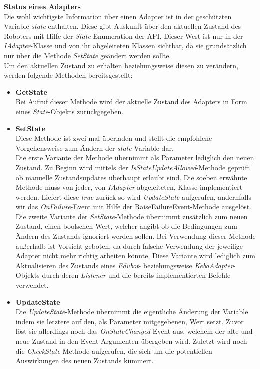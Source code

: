 \textbf{Status eines Adapters}\\
Die wohl wichtigste Information über einen Adapter ist in der geschützten Variable \textit{state} enthalten. Diese gibt Auskunft über den aktuellen Zustand des Roboters mit Hilfe der \textit{State}-Enumeration der API. Dieser Wert ist nur in der \textit{IAdapter}-Klasse und von ihr abgeleiteten Klassen sichtbar, da sie grundsätzlich nur über die Methode \textit{SetState} geändert werden sollte.\\
Um den aktuellen Zustand zu erhalten beziehungsweise diesen zu verändern, werden folgende Methoden bereitsgestellt:
\begin{itemize}
\item \textbf{GetState}\\
Bei Aufruf dieser Methode wird der aktuelle Zustand des Adapters in Form eines \textit{State}-Objekts zurückgegeben.
\item \textbf{SetState}\\
Diese Methode ist zwei mal überladen und stellt die empfohlene Vorgehensweise zum Ändern der \textit{state}-Variable dar.\\
Die erste Variante der Methode übernimmt als Parameter lediglich den neuen Zustand. Zu Beginn wird mittels der \textit{IsStateUpdateAllowed}-Methode geprüft ob manuelle Zustandsupdates überhaupt erlaubt sind. Die soeben erwähnte Methode muss von jeder, von \textit{IAdapter} abgeleiteten, Klasse implementiert werden. Liefert diese \textit{true} zurück so wird \textit{UpdateState} aufgerufen, andernfalls wir das \textit{OnFailure}-Event mit Hilfe der RaiseFailureEvent-Methode ausgelöst.\\
Die zweite Variante der \textit{SetState}-Methode übernimmt zusätzlich zum neuen Zustand, einen boolschen Wert, welcher angibt ob die Bedingungen zum Ändern des Zustands ignoriert werden sollen. Bei Verwendung dieser Methode außerhalb ist Vorsicht geboten, da durch falsche Verwendung der jeweilige Adapter nicht mehr richtig arbeiten könnte. Diese Variante wird lediglich zum Aktualisieren des Zustands eines \textit{Edubot}- beziehungsweise \textit{KebaAdapter}-Objekts durch deren \textit{Listener} und die bereits implementierten Befehle verwendet.
\item \textbf{UpdateState}\\
Die \textit{UpdateState}-Methode übernimmt die eigentliche Änderung der Variable indem sie letztere auf den, als Parameter mitgegebenen, Wert setzt. Zuvor löst sie allerdings noch das \textit{OnStateChanged}-Event aus, welchem der alte und neue Zustand in den Event-Argumenten übergeben wird. Zuletzt wird noch die \textit{CheckState}-Methode aufgerufen, die sich um die potentiellen Auswirkungen des neuen Zustands kümmert.

\end{itemize}
